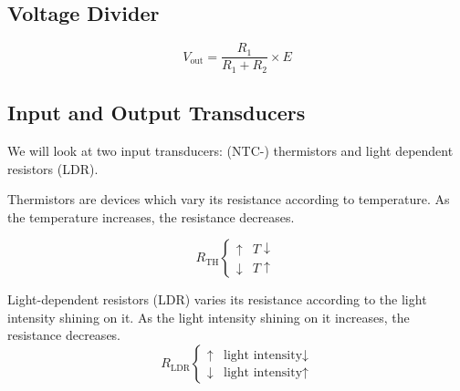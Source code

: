 \documentclass[../main.tex]{subfiles}
\begin{document}
	\subsection{Voltage Divider}
	\begin{center}
	\end{center}
	\[V_{\mathrm{out}} = \frac{R_1}{R_1 + R_2} \times E\]
	
	\subsection{Input and Output Transducers}
	We will look at two input transducers: (NTC-) thermistors and light dependent resistors (LDR).
	
	Thermistors are devices which vary its resistance according to temperature. As the temperature increases, the resistance decreases.
	
	\[
		R_{\mathrm{TH}} \begin{cases}
			\uparrow & T \downarrow \\
			\downarrow & T \uparrow
		\end{cases}
	\]
	
	Light-dependent resistors (LDR) varies its resistance according to the light intensity shining on it. As the light intensity shining on it increases, the resistance decreases.
	\[
		R_{\mathrm{LDR}} \begin{cases}
			\uparrow & \text{light intensity} \downarrow \\
			\downarrow & \text{light intensity} \uparrow
		\end{cases}
	\]
\end{document}
